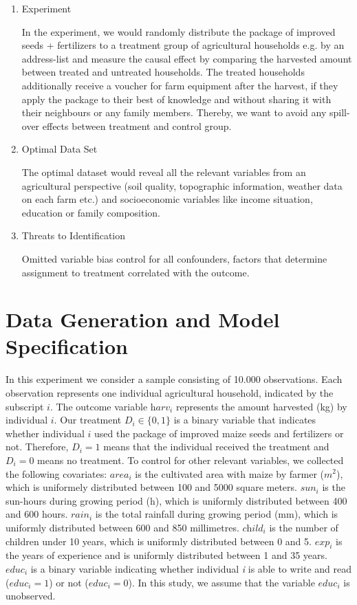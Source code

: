 \begin{enumerate}
\item Experiment

In the experiment, we would randomly distribute the package of improved seeds + fertilizers to a treatment group of agricultural households e.g. by an address-list and measure the causal effect by comparing the harvested amount between treated and untreated households. The treated households additionally receive a voucher for farm equipment after the harvest, if they apply the package to their best of knowledge and without sharing it with their neighbours or any family members. Thereby, we want to avoid any spill-over effects between treatment and control group.

\item Optimal Data Set

The optimal dataset would reveal all the relevant variables from an agricultural perspective (soil quality, topographic information, weather data on each farm etc.) and socioeconomic variables like income situation, education or family composition.

\item Threats to Identification

Omitted variable bias control for all confounders, factors that determine assignment to treatment correlated with the outcome. 

\end{enumerate}

\section{Data Generation and Model Specification} \label{sec:data}

In this experiment we consider a sample consisting of 10.000 observations. Each observation represents one individual agricultural household, indicated by the subscript $\textit{i}$. The outcome variable $\textit{harv}_i$ represents the amount harvested (kg) by individual $\textit{i}$. Our treatment $\textit{D}_i \in \{0,1\}$ is a binary variable that indicates whether individual $\textit{i}$ used the package of improved maize seeds and fertilizers or not. Therefore, $\textit{D}_i = 1$ means that the individual received the treatment and $\textit{D}_i = 0$ means no treatment. To control for other relevant variables, we collected the following covariates: $\textit{area}_i$ is the cultivated area with maize by farmer ($m^2$), which is uniformely distributed between 100 and 5000 square meters. $\textit{sun}_i$ is the sun-hours during growing period (h), which is uniformly distributed between 400 and 600 hours. $\textit{rain}_i$ is the total rainfall during growing period (mm), which is uniformly distributed between 600 and 850 millimetres. $\textit{child}_i$ is the number of children under 10 years, which is uniformly distributed between 0 and 5. $\textit{exp}_i$ is the years of experience and is uniformly distributed between 1 and 35 years. $\textit{educ}_i$ is a binary variable indicating whether individual \textit{i} is able to write and read ($\textit{educ}_i = 1$) or not ($\textit{educ}_i = 0$). In this study, we assume that the variable $\textit{educ}_i$ is unobserved.

